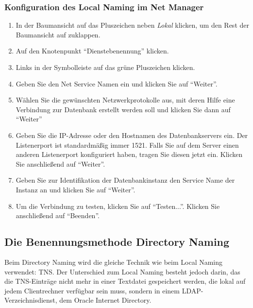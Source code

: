         \subsubsection{Konfiguration des Local Naming im Net Manager}
          \begin{enumerate}
            \item In der Baumansicht auf das Pluszeichen neben \textit{Lokal} klicken, um den Rest der Baumansicht auf zuklappen.
            \item Auf den Knotenpunkt \enquote{Dienstebenennung} klicken.
            \item Links in der Symbolleiste auf das grüne Pluszeichen klicken.
            \item Geben Sie den Net Service Namen ein und klicken Sie auf \enquote{Weiter}.
\clearpage
            \item Wählen Sie die gewünschten Netzwerkprotokolle aus, mit deren Hilfe eine Verbindung zur Datenbank erstellt werden soll und klicken Sie dann auf \enquote{Weiter}
            \item Geben Sie die IP-Adresse oder den Hostnamen des Datenbankservers ein. Der Listenerport ist standardmäßig immer 1521. Falls Sie auf dem Server einen anderen Listenerport konfiguriert haben, tragen Sie diesen jetzt ein. Klicken Sie anschließend auf \enquote{Weiter}.
\clearpage
            \item Geben Sie zur Identifikation der Datenbankinstanz den Service Name der Instanz an und klicken Sie auf \enquote{Weiter}.
            \item Um die Verbindung zu testen, klicken Sie auf \enquote{Testen...}. Klicken Sie anschließend auf \enquote{Beenden}.
\clearpage

          \end{enumerate}
      \subsection{Die Benennungsmethode Directory Naming}
        Beim Directory Naming wird die gleiche Technik wie beim Local Naming verwendet: TNS. Der Unterschied zum Local Naming besteht jedoch darin, das die TNS-Einträge nicht mehr in einer Textdatei gespeichert werden, die lokal auf jedem Clientrechner verfügbar sein muss, sondern in einem LDAP-Verzeichnisdienst, dem Oracle Internet Directory.


